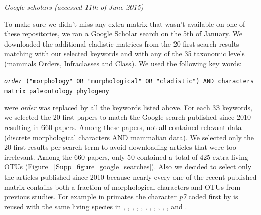 \documentclass[12pt,letterpaper]{article}
\renewcommand{\subsection}[1]{%
\bigskip
\begin{center}
\begin{large}
\normalfont\itshape #1
\end{large}
\end{center}}
\begin{document}
\subsection{Google scholars (accessed 11th of June 2015)}
To make sure we didn't miss any extra matrix that wasn't available on one of these repositories, we ran a Google Scholar search on the 5th of January. 
We downloaded the additional cladistic matrices from the 20 first search results matching with our selected keywords and with any of the 35 taxonomic levels (mammals Orders, Infraclasses and Class).
We used the following key words:

\texttt{\textit{order} ("morphology" OR "morphological" OR "cladistic") AND characters matrix paleontology phylogeny}

were \textit{order} was replaced by all the keywords listed above. For each 33 keywords, we selected the 20 first papers to match the Google search published since 2010 resulting in 660 papers.
Among these papers, not all contained relevant data (discrete morphological characters AND mammalian data).
We selected only the 20 first results per search term to avoid downloading articles that were too irrelevant. Among the 660 papers, only 50 contained a total of 425 extra living OTUs (Figure ~\ref{Supp_figure_google_searches}).
Also we decided to select only the articles published since 2010 because nearly every one of the recent published matrix contains both a fraction of morphological characters and OTUs from previous studies.
For example in primates the character \textit{p7} coded first by \cite{ross1998phylogenetic} is reused with the same living species in \cite{seiffert2003fossil}, \cite{marivaux2005anthropoid}, \cite{seiffert2005basal}, \cite{bloch2007new}, \cite{bloch2007new}, \cite{kay2008anatomy}, \cite{silcox2008biogeographic}, \cite{seiffert2009convergent}, \cite{tabuce2009anthropoid}, \cite{boyer2010astragalar}, \cite{seiffert2010fossil}, \cite{marivaux2013djebelemur} and \cite{ni2013oldest}.
\end{document}
